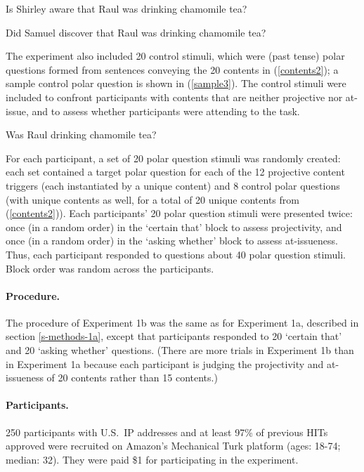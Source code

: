 \documentclass[11pt,fleqn]{article}
\newcommand{\6}{\mbox{$[\hspace*{-.6mm}[$}}
\newcommand{\9}{\mbox{$]\hspace*{-.6mm}]$}}
\begin{document}
\begin{exe}
\ex\label{sample2}
\begin{xlist}
\ex Is Shirley aware that Raul was drinking chamomile tea?

\ex Did Samuel discover that Raul was drinking chamomile tea?
\end{xlist}
\end{exe}

The experiment also included 20 control stimuli, which were (past tense) polar questions formed from sentences conveying the 20 contents in (\ref{contents2}); a sample control polar question is shown in (\ref{sample3}). The control stimuli were included to confront participants with contents that are neither projective nor at-issue, and to assess whether participants were attending to the task.

\begin{exe}
\ex\label{sample3} Was Raul drinking chamomile tea?
\end{exe}

For each participant, a set of 20 polar question stimuli was randomly created: each set contained a target polar question for each of the 12 projective content triggers (each  instantiated by a unique content) and 8 control polar questions (with unique contents as well, for a total of 20 unique contents from (\ref{contents2})). Each participants' 20 polar question stimuli were presented twice: once (in a random order) in the `certain that' block to assess projectivity, and once (in a random order) in the `asking whether' block to assess at-issueness. Thus, each participant responded to questions about 40 polar question stimuli. Block order was random across the participants.

\paragraph{Procedure.} The procedure of Experiment 1b was the same as for Experiment 1a, described in section \ref{s-methods-1a}, except that participants responded to 20 `certain that' and 20 `asking whether' questions. (There are more trials in Experiment 1b than in Experiment 1a because each participant is judging the projectivity and at-issueness of 20 contents rather than 15 contents.)

\paragraph{Participants.} 250 participants with U.S.\ IP addresses and at least 97\% of previous HITs approved were recruited on Amazon's Mechanical Turk platform (ages: 18-74; median: 32). They were paid \$1 for participating in the experiment. 
\end{document}
